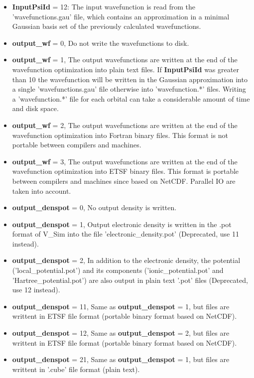 \documentclass[a4paper,11pt]{report}
\begin{document}
\begin{itemize}
\begin{itemize}
       \item {\bf InputPsiId } = 12: The input wavefunction is read from the 'wavefunctions.gau'  file, which contains an 
            approximation in a minimal Gaussian basis set of the previously calculated wavefunctions.
       \item {\bf output\_wf} = 0, Do not write the wavefunctions to disk.
       \item {\bf output\_wf} = 1, The output wavefunctions are written at the end of the wavefunction optimization 
            into plain text files. If {\bf InputPsiId } was greater than 10 the wavefunction will be written 
            in the Gaussian approximation into  a single 'wavefunctions.gau' file otherwise into 
            'wavefunction.*' files. Writing a  'wavefunction.*' file for each orbital can take a considerable 
            amount of time and disk space. 
       \item {\bf output\_wf} = 2, The output wavefunctions are written at the end of the wavefunction optimization 
            into Fortran binary files. This format is not portable between compilers and machines. 
       \item {\bf output\_wf} = 3, The output wavefunctions are written at the end of the wavefunction optimization 
            into ETSF binary files. This format is portable between compilers and machines since based on NetCDF. Parallel IO are taken into account.
       \item {\bf output\_denspot} = 0, No output density is written.
       \item {\bf output\_denspot} = 1, Output electronic density is written in the .pot format of V\_Sim into the file 'electronic\_density.pot' (Deprecated, use 11 instead).
       \item {\bf output\_denspot} = 2, In addition to the electronic density, the potential ('local\_potential.pot') and its components ('ionic\_potential.pot' and 'Hartree\_potential.pot') are also output in plain text '.pot' files (Deprecated, use 12 instead).
       \item {\bf output\_denspot} = 11, Same as {\bf output\_denspot} = 1, but files are writtent in ETSF file format (portable binary format based on NetCDF).
       \item {\bf output\_denspot} = 12, Same as {\bf output\_denspot} = 2, but files are writtent in ETSF file format (portable binary format based on NetCDF).
       \item {\bf output\_denspot} = 21, Same as {\bf output\_denspot} = 1, but files are writtent in '.cube' file format (plain text).

\end{itemize}
\end{itemize}
\end{document}
